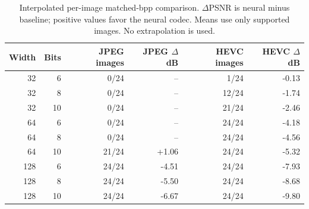 \begin{table}[htbp]
\centering
\small
\caption{Interpolated per-image matched-bpp comparison. $\Delta$PSNR is neural minus baseline; positive values favor the neural codec. Means use only supported images. No extrapolation is used.}
\label{tab:matched_bpp}
\begin{tabular}{rrrrrr}
\toprule
Width & Bits & JPEG images & JPEG $\Delta$dB & HEVC images & HEVC $\Delta$dB \\
\midrule
32 & 6 & 0/24 & -- & 1/24 & -0.13 \\
32 & 8 & 0/24 & -- & 12/24 & -1.74 \\
32 & 10 & 0/24 & -- & 21/24 & -2.46 \\
64 & 6 & 0/24 & -- & 24/24 & -4.18 \\
64 & 8 & 0/24 & -- & 24/24 & -4.56 \\
64 & 10 & 21/24 & +1.06 & 24/24 & -5.32 \\
128 & 6 & 24/24 & -4.51 & 24/24 & -7.93 \\
128 & 8 & 24/24 & -5.50 & 24/24 & -8.68 \\
128 & 10 & 24/24 & -6.67 & 24/24 & -9.80 \\
\bottomrule
\end{tabular}
\end{table}